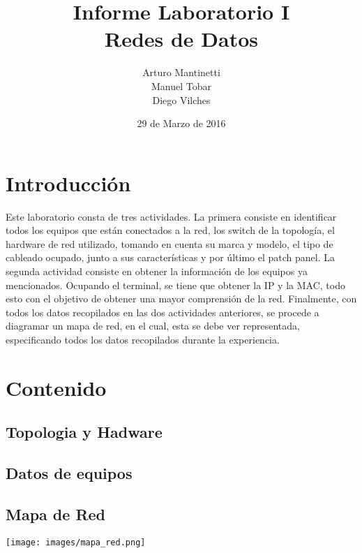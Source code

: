 \documentclass[spanish]{udpreport}
\title{Informe Laboratorio I \\ Redes de Datos}
\author{Arturo Mantinetti \\ Manuel Tobar \\ Diego Vilches}
\date{29 de Marzo de 2016}
\begin{document}
\maketitle

\tableofcontents

\chapter{Introducción}

Este laboratorio consta de tres actividades. La primera consiste en identificar todos los equipos que están conectados a la red, los switch de la topología, el hardware de red utilizado, tomando en cuenta su marca y modelo, el tipo de cableado ocupado, junto a sus características y por último el patch panel. La segunda actividad consiste en obtener la información de los equipos ya mencionados. Ocupando el terminal, se tiene que obtener la IP y la MAC, todo esto con el objetivo de obtener una mayor comprensión de la red. Finalmente, con todos los datos recopilados en las dos actividades anteriores, se procede a diagramar un mapa de red, en el cual, esta se debe ver representada,  especificando todos los datos recopilados durante la experiencia.


\chapter{Contenido}

\section{Topologia y Hadware}

\section{Datos de equipos}


\pagebreak
\section{Mapa de Red}

\begin{center}
	\texttt{[image: images/mapa\_red.png]} 
\end{center}

\listoffigures
\end{document}
